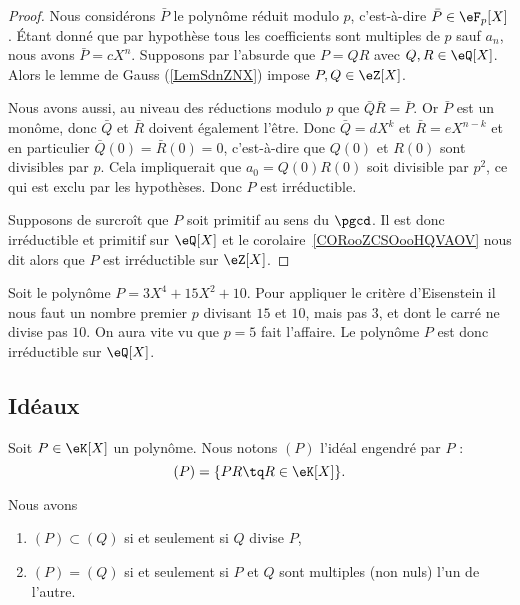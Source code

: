 \begin{proof}
	Nous considérons \( \bar P\) le polynôme réduit modulo \( p\), c'est-à-dire \( \bar P\in \eF_p[X]\). Étant donné que par hypothèse tous les coefficients sont multiples de \( p\) sauf \( a_n\), nous avons \( \bar P=cX^n\). Supposons par l'absurde que \( P=QR\) avec \( Q,R\in \eQ[X]\). Alors le lemme de Gauss (\ref{LemSdnZNX}) impose \( P,Q\in \eZ[X]\).

	Nous avons aussi, au niveau des réductions modulo \( p\) que $\bar Q\bar R=\bar P$. Or \( \bar P\) est un monôme, donc \( \bar Q\) et \( \bar R\) doivent également l'être. Donc \( \bar Q=dX^k\) et \( \bar R=eX^{n-k}\) et en particulier \( \bar Q(0)=\bar R(0)=0\), c'est-à-dire que \( Q(0)\) et \( R(0)\) sont divisibles par \( p\). Cela impliquerait que \( a_0=Q(0)R(0)\) soit divisible par \( p^2\), ce qui est exclu par les hypothèses. Donc \( P\) est irréductible.

	Supposons de surcroît que \( P\) soit primitif au sens du \( \pgcd\). Il est donc irréductible et primitif sur \( \eQ[X]\) et le corolaire~\ref{CORooZCSOooHQVAOV} nous dit alors que \( P\) est irréductible sur \( \eZ[X]\).
\end{proof}

\begin{example}
	Soit le polynôme \( P=3X^4+15 X^2+10\). Pour appliquer le critère d'Eisenstein il nous faut un nombre premier \( p\) divisant \( 15\) et \( 10\), mais pas \( 3\), et dont le carré ne divise pas \( 10\). On aura vite vu que \( p=5\) fait l'affaire. Le polynôme \( P\) est donc irréductible sur \( \eQ[X]\).
\end{example}

\subsection{Idéaux}

Soit \( P\in \eK[X]\) un polynôme. Nous notons \( (P)\) l'idéal engendré par \( P\) :
\begin{equation}        \label{EqDefxMkDtW}
	(P)=\{ PR\tq R\in\eK[X] \}.
\end{equation}

\begin{lemma}
	Nous avons
	\begin{enumerate}
		\item
		      \( (P)\subset (Q)\) si et seulement si \( Q\) divise \( P\),
		\item
		      \( (P)=(Q)\) si et seulement si \( P\) et \( Q\) sont multiples (non nuls) l'un de l'autre.
	\end{enumerate}
\end{lemma}

